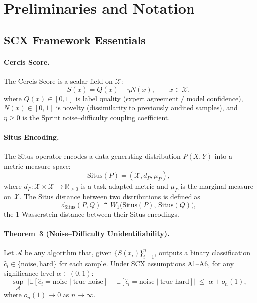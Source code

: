 \documentclass[12pt,a4paper]{article}
\newcommand{\R}{\mathbb{R}}
\newcommand{\E}{\mathbb{E}}
\newcommand{\cX}{\mathcal{X}}
\newcommand{\cA}{\mathcal{A}}
\newcommand{\Situs}{\mathrm{Situs}}
\newcommand{\defeq}{\triangleq}
\begin{document}
\section{Preliminaries and Notation}
\label{sec:prelim}

\subsection{SCX Framework Essentials}

\paragraph{Cercis Score.}
The Cercis Score is a scalar field on $\cX$:
\begin{equation}\label{eq:cercis-def}
    S(x) = Q(x) + \eta N(x),\qquad x \in \cX,
\end{equation}
where $Q(x) \in [0,1]$ is label quality (expert agreement / model confidence),
$N(x) \in [0,1]$ is novelty (dissimilarity to previously audited samples),
and $\eta \geq 0$ is the Sprint noise--difficulty coupling coefficient.

\paragraph{Situs Encoding.}
The Situs operator encodes a data-generating distribution $P(X,Y)$ into a metric-measure space:
\begin{equation}\label{eq:situs-def}
    \Situs(P) = (\cX, d_P, \mu_P),
\end{equation}
where $d_P: \cX \times \cX \to \R_{\geq 0}$ is a task-adapted metric and $\mu_P$ is the marginal measure on $\cX$.
The Situs distance between two distributions is defined as
\begin{equation}\label{eq:situs-dist}
    d_{\Situs}(P, Q) \defeq W_1\big(\Situs(P),\, \Situs(Q)\big),
\end{equation}
the 1-Wasserstein distance between their Situs encodings.

\paragraph{Theorem~3 (Noise--Difficulty Unidentifiability).}
Let $\cA$ be any algorithm that, given $\{S(x_i)\}_{i=1}^n$, outputs a binary classification $\hat{c}_i \in \{\text{noise},\text{hard}\}$ for each sample.
Under \textsf{SCX} assumptions A1--A6, for any significance level $\alpha \in (0,1)$:
\begin{equation}\label{eq:thm3-statement}
    \sup_{\cA}\; \big|\E[\hat{c}_i = \text{noise} \mid \text{true noise}]
    - \E[\hat{c}_i = \text{noise} \mid \text{true hard}]\big|
    \;\leq\; \alpha + o_n(1),
\end{equation}
where $o_n(1) \to 0$ as $n \to \infty$.
\end{document}
